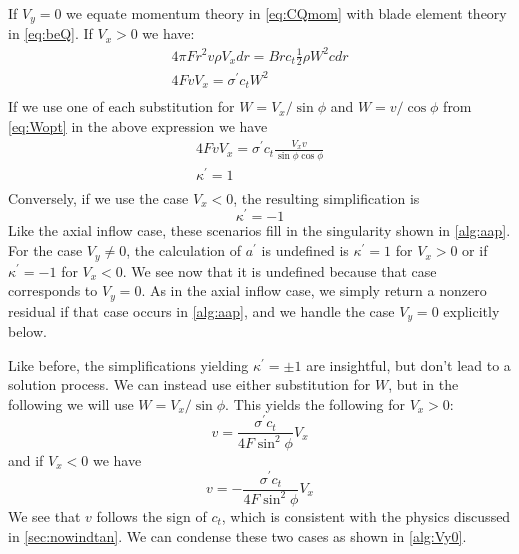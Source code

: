 If $V_y = 0$ we equate momentum theory in \cref{eq:CQmom} with blade element theory in \cref{eq:beQ}.  If $V_x > 0$ we have:
\begin{equation}
\begin{aligned}
4 \pi F r^2 v \rho V_x dr = B r c_t \frac{1}{2} \rho W^2 c dr\\
4  F v  V_x  = \sigma^\prime c_t  W^2 \\
\end{aligned}
\end{equation}
If we use one of each substitution for $W = V_x/\sin\phi$ and $W = v/\cos\phi$ from \cref{eq:Wopt} in the above expression we have
\begin{equation}
\begin{aligned}
4  F v  V_x  = \sigma^\prime c_t \frac{V_x v}{\sin\phi \cos\phi} \\
\kappa^\prime = 1\\
\end{aligned}
\end{equation}
Conversely, if we use the case $V_x < 0$, the resulting simplification is
\begin{equation}
    \kappa^\prime = -1
\end{equation}
Like the axial inflow case, these scenarios fill in the singularity shown in \cref{alg:aap}.  For the case $V_y \ne 0$, the calculation of $a^\prime$ is undefined is $\kappa^\prime = 1$ for $V_x > 0$ or if $\kappa^\prime = -1$ for $V_x < 0$.  We see now that it is undefined because that case corresponds to $V_y = 0$.  As in the axial inflow case, we simply return a nonzero residual if that case occurs in \cref{alg:aap}, and we handle the case $V_y = 0$ explicitly below.



Like before, the simplifications yielding $\kappa^\prime = \pm1$ are insightful, but don't lead to a solution process.  We can instead use either substitution for $W$, but in the following we will use $W = V_x / \sin\phi$.  This yields the following for $V_x > 0$:
\begin{equation}
    v = \frac{\sigma^\prime c_t}{4 F \sin^2\phi} V_x
\end{equation}
and if $V_x < 0$ we have
\begin{equation}
    v = -\frac{\sigma^\prime c_t}{4 F \sin^2\phi} V_x
\end{equation}
We see that $v$ follows the sign of $c_t$, which is consistent with the physics discussed in \cref{sec:nowindtan}.  We can condense these two cases as shown in \cref{alg:Vy0}.

